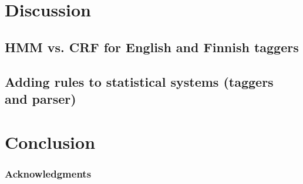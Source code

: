 \documentclass{llncs}
\begin{document}
\section{Discussion}\label{hfst:discussion}

\subsection{HMM vs. CRF for English and Finnish taggers}

\subsection{Adding rules to statistical systems (taggers and parser)}

\section{Conclusion}\label{hfst:conclusion}

\subsubsection*{Acknowledgments}



\end{document}
